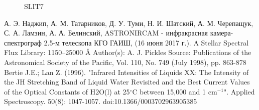 \documentclass[a4paper]{article}
\begin{document}
\begin{figure}[h]
\begin{minipage}[h]{0.5\linewidth}
\end{minipage}
\begin{minipage}[h]{0.5\linewidth}
\end{minipage}
\begin{minipage}[h]{0.5\linewidth}
\end{minipage}
\caption{SLIT7}
\end{figure}
\clearpage
\begin{thebibliography}{3}
А. Э. Наджип, А. М. Татарников, Д. У. Туми, Н. И. Шатский, А. М. Черепащук, С. А. Ламзин, А. А. Белинский,  ASTRONIRCAM - инфракрасная камера-спектрограф 2.5-м телескопа КГО ГАИШ, (16 июня 2017 г.).
A Stellar Spectral Flux Library: 1150–25000 Å
Author(s): A. J.  Pickles
Source: 
Publications of the Astronomical Society of the Pacific, 
Vol. 110, No. 749 (July 1998),
pp. 863-878
Bertie J.E.; Lan Z. (1996). "Infrared Intensities of Liquids XX: The Intensity of the JH Stretching Band of Liquid Water Revisited and the Best Current Values of the Optical Constants of H2O(l) at 25$^\circ$C between 15,000 and 1 cm$^{-1}$". Applied Spectroscopy. 50(8): 1047-1057.
doi:10.1366/0003702963905385
\end{thebibliography}
\end{document}
